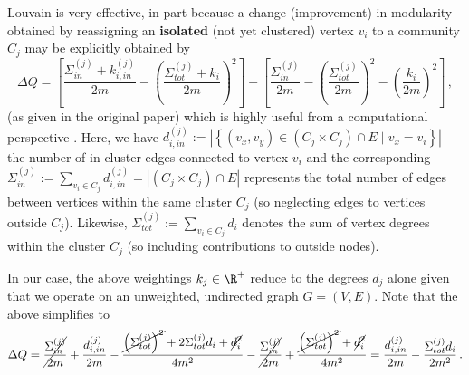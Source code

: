 \documentclass{prettytex/ox/mmsc-special-topic}
\begin{document}
  Louvain is very effective, in part because a change (improvement) in modularity obtained by reassigning an \textbf{isolated} (not yet clustered) vertex $v_i$ to a community $C_j$ may be explicitly obtained by
  \begin{equation}
    \Delta Q=\left[ \frac{\Sigma_{in}^{(j)} + k_{i,in}^{(j)}}{2 m} - \left(\frac{\Sigma_{tot}^{(j)} + k_{i}}{2m}\right)^2 \right] - \left[ \frac{\Sigma_{in}^{(j)}}{2m} - \left(\frac{\Sigma_{tot}^{(j)}}{2m}\right)^2 - \left(\frac{k_i}{2m}\right)^2 \right] \,,
    \label{eq:blondel-deltaQ}
  \end{equation}
  (as given in the original paper) which is highly useful from a computational perspective \parencite{lambiotte-louvain-clustering}.
  Here, we have $d_{i,in}^{(j)} := \left|\left\{(v_x, v_y) \in (C_j \times C_j) \cap E \;\big|\; v_x = v_i\right\}\right|$ the number of in-cluster edges connected to vertex $v_i$ and the corresponding $\Sigma_{in}^{(j)} := \sum_{v_i \in C_j} d_{i,in}^{(j)} = \left|(C_j \times C_j) \cap E\right|$ represents the total number of edges between vertices within the same cluster $C_j$ (so neglecting edges to vertices outside $C_j$).
  Likewise, $\Sigma_{tot}^{(j)} := \sum_{v_i \in C_j} d_i$ denotes the sum of vertex degrees within the cluster $C_j$ (so including contributions to outside nodes).

  In our case, the above weightings $k_j \in \R^+$ reduce to the degrees $d_j$ alone given that we operate on an unweighted, undirected graph $G = (V, E)$. Note that the above  simplifies to
  \begin{equation}
    \Delta Q = \cancel{\frac{\Sigma_{in}^{(j)}}{2m}} + \frac{d_{i, in}^{(j)}}{2m} - \frac{\cancel{\left(\Sigma_{tot}^{(j)}\right)^2} + 2 \Sigma_{tot}^{(j)} d_i + \cancel{d_i^2}}{4m^2} - \cancel{\frac{\Sigma_{in}^{(j)}}{2m}} + \frac{\cancel{\left(\Sigma_{tot}^{(j)}\right)^2} + \cancel{d_i^2}}{4m^2} = \frac{d_{i, in}^{(j)}}{2m} - \frac{\Sigma_{tot}^{(j)} d_i}{2m^2} \,.
    \label{eq:blondel-deltaQ-simplified}
  \end{equation}
\end{document}
